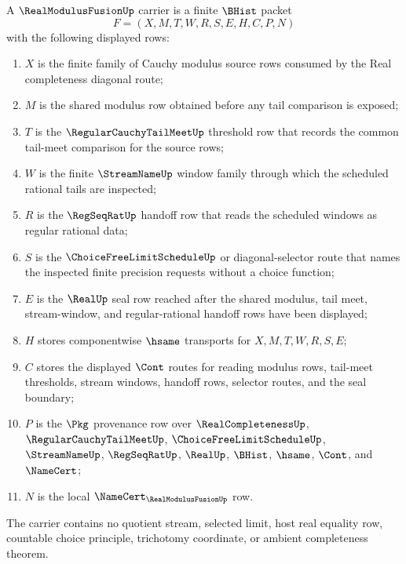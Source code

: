 \begin{definition}
\label{def:real-modulus-fusion-carrier}
A $\RealModulusFusionUp$ carrier is a finite $\BHist$ packet
$$
F=(X,M,T,W,R,S,E,H,C,P,N)
$$
with the following displayed rows:
\begin{enumerate}
\item $X$ is the finite family of Cauchy modulus source rows consumed by the Real completeness diagonal route;
\item $M$ is the shared modulus row obtained before any tail comparison is exposed;
\item $T$ is the $\RegularCauchyTailMeetUp$ threshold row that records the common tail-meet comparison for the source rows;
\item $W$ is the finite $\StreamNameUp$ window family through which the scheduled rational tails are inspected;
\item $R$ is the $\RegSeqRatUp$ handoff row that reads the scheduled windows as regular rational data;
\item $S$ is the $\ChoiceFreeLimitScheduleUp$ or diagonal-selector route that names the inspected finite precision requests without a choice function;
\item $E$ is the $\RealUp$ seal row reached after the shared modulus, tail meet, stream-window, and regular-rational handoff rows have been displayed;
\item $H$ stores componentwise $\hsame$ transports for $X,M,T,W,R,S,E$;
\item $C$ stores the displayed $\Cont$ routes for reading modulus rows, tail-meet thresholds, stream windows, handoff rows, selector routes, and the seal boundary;
\item $P$ is the $\Pkg$ provenance row over $\RealCompletenessUp$, $\RegularCauchyTailMeetUp$, $\ChoiceFreeLimitScheduleUp$, $\StreamNameUp$, $\RegSeqRatUp$, $\RealUp$, $\BHist$, $\hsame$, $\Cont$, and $\NameCert$;
\item $N$ is the local $\NameCert_{\RealModulusFusionUp}$ row.
\end{enumerate}
The carrier contains no quotient stream, selected limit, host real equality row, countable choice principle, trichotomy coordinate, or ambient completeness theorem.
\end{definition}

